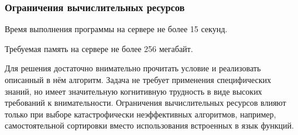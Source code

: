 
\subsubsection*{Ограничения вычислительных ресурсов}

Время выполнения программы на сервере не более 15 секунд.

Требуемая память на сервере не более 256 мегабайт.

\solutionSection

Для решения достаточно внимательно прочитать условие и реализовать описанный в нём алгоритм. Задача не требует применения специфических знаний, но имеет значительную когнитивную трудность в виде высоких требований к внимательности. Ограничения вычислительных ресурсов влияют только при выборе катастрофически неэффективных алгоритмов, например, самостоятельной сортировки вместо использования встроенных в язык функций.

